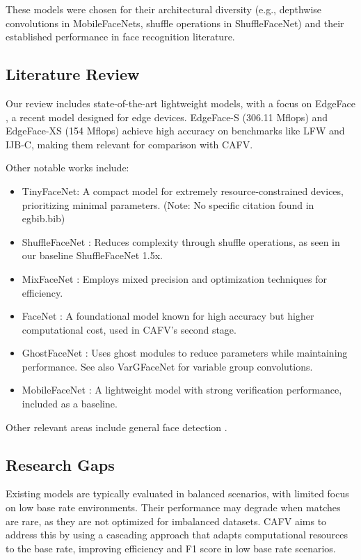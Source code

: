 \documentclass[times,10pt,twocolumn]{article}
\begin{document}
These models were chosen for their architectural diversity (e.g., depthwise convolutions in MobileFaceNets, shuffle operations in ShuffleFaceNet) and their established performance in face recognition literature.

\subsection{Literature Review}
Our review includes state-of-the-art lightweight models, with a focus on EdgeFace \cite{edgeface2023}, a recent model designed for edge devices. EdgeFace-S (306.11 Mflops) and EdgeFace-XS (154 Mflops) achieve high accuracy on benchmarks like LFW and IJB-C, making them relevant for comparison with CAFV.

Other notable works include:
\begin{itemize}
    \item TinyFaceNet: A compact model for extremely resource-constrained devices, prioritizing minimal parameters. (Note: No specific citation found in egbib.bib)
    \item ShuffleFaceNet \cite{shufflefacenet}: Reduces complexity through shuffle operations, as seen in our baseline ShuffleFaceNet 1.5x.
    \item MixFaceNet \cite{mixfacenet}: Employs mixed precision and optimization techniques for efficiency.
    \item FaceNet \cite{facenet}: A foundational model known for high accuracy but higher computational cost, used in CAFV's second stage.
    \item GhostFaceNet \cite{ghostfacenet}: Uses ghost modules to reduce parameters while maintaining performance. See also VarGFaceNet \cite{vargfacenet} for variable group convolutions.
    \item MobileFaceNet \cite{mobilefacenet}: A lightweight model with strong verification performance, included as a baseline.
\end{itemize}
Other relevant areas include general face detection \cite{mtcnn, mtagging}.

\subsection{Research Gaps}
Existing models are typically evaluated in balanced scenarios, with limited focus on low base rate environments. Their performance may degrade when matches are rare, as they are not optimized for imbalanced datasets. CAFV aims to address this by using a cascading approach that adapts computational resources to the base rate, improving efficiency and F1 score in low base rate scenarios.
\end{document}

